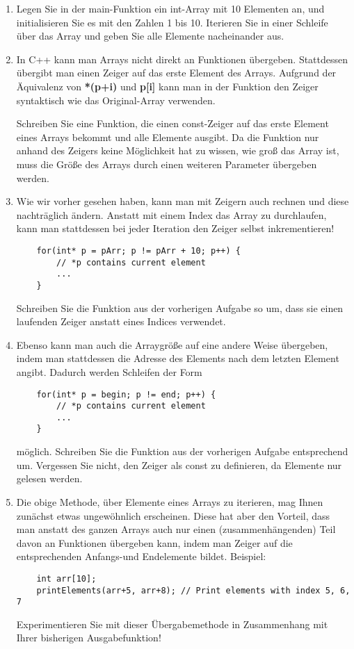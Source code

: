 \documentclass[
  accentcolor=tud1c,	%
  colorbacktitle,		%
  inverttitle,			%
  german,				%
  twoside
]{tudexercise}
\begin{document}
\begin{enumerate}
\item Legen Sie in der main-Funktion ein int-Array mit 10 Elementen an, und initialisieren Sie es mit den Zahlen 1 bis 10. Iterieren Sie in einer Schleife über das Array und geben Sie alle Elemente nacheinander aus.

\item In C++ kann man Arrays nicht direkt an Funktionen übergeben. Stattdessen übergibt man einen Zeiger auf das erste Element des Arrays. Aufgrund der Äquivalenz von \textbf{*(p+i) } und \textbf{p[i]} kann man in der Funktion den Zeiger syntaktisch wie das Original-Array verwenden.

Schreiben Sie eine Funktion, die einen const-Zeiger auf das erste Element eines Arrays bekommt und alle Elemente ausgibt. Da die Funktion nur anhand des Zeigers keine Möglichkeit hat zu wissen, wie groß das Array ist, muss die Größe des Arrays durch einen weiteren Parameter übergeben werden. 

\item Wie wir vorher gesehen haben, kann man mit Zeigern auch rechnen und diese nachträglich ändern. Anstatt mit einem Index das Array zu durchlaufen, kann man stattdessen bei jeder Iteration den Zeiger selbst inkrementieren! 

\begin{lstlisting}
	for(int* p = pArr; p != pArr + 10; p++) {
		// *p contains current element
		...
	}
\end{lstlisting}

Schreiben Sie die Funktion aus der vorherigen Aufgabe so um, dass sie einen laufenden Zeiger anstatt eines Indices verwendet.

\item Ebenso kann man auch die Arraygröße auf eine andere Weise übergeben, indem man stattdessen die Adresse des Elements nach dem letzten Element angibt. Dadurch werden Schleifen der Form
\begin{lstlisting}
	for(int* p = begin; p != end; p++) {
		// *p contains current element
		...
	}
\end{lstlisting}

möglich. Schreiben Sie die Funktion aus der vorherigen Aufgabe entsprechend um. Vergessen Sie nicht, den Zeiger als const zu definieren, da Elemente nur gelesen werden.

\item Die obige Methode, über Elemente eines Arrays zu iterieren, mag Ihnen zunächst etwas ungewöhnlich erscheinen. Diese hat aber den Vorteil, dass man anstatt des ganzen Arrays auch nur einen (zusammenhängenden) Teil davon an Funktionen übergeben kann, indem man Zeiger auf die entsprechenden Anfangs-und Endelemente bildet. Beispiel:
\begin{lstlisting}
	int arr[10];
	printElements(arr+5, arr+8); // Print elements with index 5, 6, 7
\end{lstlisting}
Experimentieren Sie mit dieser Übergabemethode in Zusammenhang mit Ihrer bisherigen Ausgabefunktion!


\end{enumerate}
\end{document}
